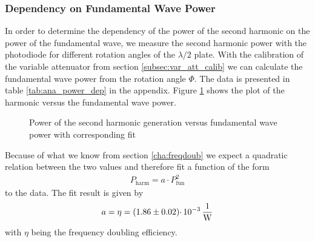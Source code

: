\documentclass{protokoll_en}
\begin{document}
\subsubsection{Dependency on Fundamental Wave Power}
\label{subsubsec:ana_power_dep}
In order to determine the dependency of the power of the second harmonic on the power of the fundamental wave, we measure the second harmonic power with the photodiode for different rotation angles of the $\lambda / 2$ plate. With the calibration of the variable attenuator from section \ref{subsec:var_att_calib} we can calculate the fundamental wave power from the rotation angle $\Phi$. The data is presented in table \ref{tab:ana_power_dep} in the appendix. Figure \ref{fig:ana_power_dep} shows the plot of the harmonic versus the fundamental wave power.
\begin{figure}[H]
  \resizebox{0.8\textwidth}{!}{
     
}
  \caption{Power of the second harmonic generation versus fundamental wave power with corresponding fit}
  \label{fig:ana_power_dep}
\end{figure}
Because of what we know from section \ref{cha:freqdoub} we expect a quadratic relation between the two values and therefore fit a function of the form
\begin{align}
P_\textrm{harm} = a\cdotp P^2_\textrm{fun}
\end{align}
to the data. The fit result is given by
\begin{align}
a = \eta = \unit[(1.86 \pm 0.02)\cdotp 10^{-3}]{\frac{1}{W}}
\end{align}
with $\eta$ being the frequency doubling efficiency.
\end{document}
